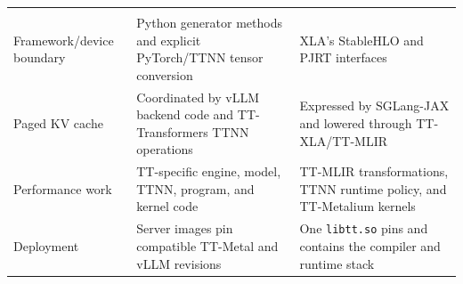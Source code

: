 \documentclass[
  10pt,
  american,
  10pt,
  letterpaper]{article}
\begin{document}
\begin{longtable}[]{@{}lll@{}}
\begin{minipage}[t]{0.30\columnwidth}
\end{minipage}\tabularnewline
\begin{minipage}[t]{0.30\columnwidth}\raggedright
Framework/device boundary\strut
\end{minipage} & \begin{minipage}[t]{0.30\columnwidth}\raggedright
Python generator methods and explicit PyTorch/TTNN tensor
conversion\strut
\end{minipage} & \begin{minipage}[t]{0.30\columnwidth}\raggedright
XLA's StableHLO and PJRT interfaces\strut
\end{minipage}\tabularnewline
\begin{minipage}[t]{0.30\columnwidth}\raggedright
Paged KV cache\strut
\end{minipage} & \begin{minipage}[t]{0.30\columnwidth}\raggedright
Coordinated by vLLM backend code and TT-Transformers TTNN
operations\strut
\end{minipage} & \begin{minipage}[t]{0.30\columnwidth}\raggedright
Expressed by SGLang-JAX and lowered through TT-XLA/TT-MLIR\strut
\end{minipage}\tabularnewline
\begin{minipage}[t]{0.30\columnwidth}\raggedright
Performance work\strut
\end{minipage} & \begin{minipage}[t]{0.30\columnwidth}\raggedright
TT-specific engine, model, TTNN, program, and kernel code\strut
\end{minipage} & \begin{minipage}[t]{0.30\columnwidth}\raggedright
TT-MLIR transformations, TTNN runtime policy, and TT-Metalium
kernels\strut
\end{minipage}\tabularnewline
\begin{minipage}[t]{0.30\columnwidth}\raggedright
Deployment\strut
\end{minipage} & \begin{minipage}[t]{0.30\columnwidth}\raggedright
Server images pin compatible TT-Metal and vLLM revisions\strut
\end{minipage} & \begin{minipage}[t]{0.30\columnwidth}\raggedright
One \texttt{libtt.so} pins and contains the compiler and runtime
stack\strut
\end{minipage}\tabularnewline
\bottomrule
\end{longtable}
\end{document}

